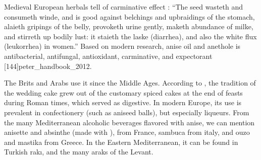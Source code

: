 Medieval European herbals tell of carminative effect \autocite[880 ]{gerarde_herball_1597}: ``The seed wasteth and consumeth winde, and is good against belchings and upbraidings of the stomach, alaieth gripings of the belly, provoketh urine gently, maketh abundance of milke, and stirreth up bodily lust: it staieth the laske (diarrhea), and also the white flux (leukorrhea) in women.'' Based on modern research, anise oil and anethole is antibacterial, antifungal, antioxidant, carminative, and expectorant [144]{peter_handbook_2012}.

The Brits and Arabs use it since the Middle Ages. According to \textcite{wilson_wedding_2005}, 
the tradition of the wedding cake grew out of the customary spiced cakes at the end of feasts during Roman times, which served as digestive. In modern Europe, its use is prevalent in confectionery (such as aniseed balls), but especially liqueurs. From the many Mediterranean alcoholic beverages flavored with anise, we can mention anisette and absinthe (made with ), from France, sambuca from italy, and ouzo and mastika from Greece. 
In the Eastern Mediterranean, it can be found in Turkish rakı, and the many araks of the Levant.


